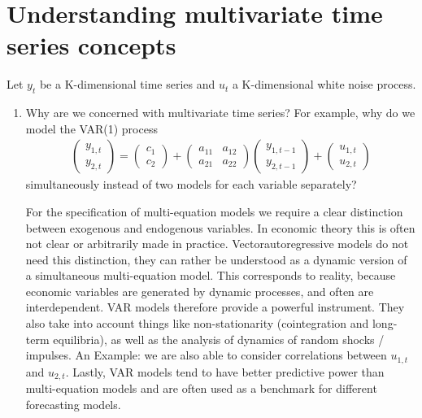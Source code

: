 \documentclass[a4paper]{scrartcl}
\begin{document}
    \section{Understanding multivariate time series concepts}
    Let $y_t$ be a K-dimensional time series and $u_t$ a K-dimensional white noise process.
    \begin{enumerate}
        \item Why are we concerned with multivariate time series? For example, why do we model the VAR(1) process
              \begin{align*}
                  \begin{pmatrix}y_{1,t}\\ y_{2,t}\end{pmatrix} = \begin{pmatrix} c_1 \\ c_2\end{pmatrix} + \begin{pmatrix}a_{11} & a_{12}\\ a_{21} & a_{22} \end{pmatrix} \begin{pmatrix}y_{1,{t-1}}\\ y_{2,{t-1}}\end{pmatrix} + \begin{pmatrix}u_{1,t}\\ u_{2,t}\end{pmatrix}
              \end{align*}
              simultaneously instead of two models for each variable separately?
              \begin{solution}
                  For the specification of multi-equation models we require a clear distinction between exogenous and endogenous variables. In economic theory this is often not clear or arbitrarily made in practice. Vectorautoregressive models do not need this distinction, they can rather be understood as a dynamic version of a simultaneous multi-equation model. This corresponds to reality, because economic variables are generated by dynamic processes, and often are interdependent. VAR models therefore provide a powerful instrument. They also take into account things like non-stationarity (cointegration and long-term equilibria), as well as the analysis of dynamics of random shocks / impulses. An Example: we are also able to consider correlations between $ u_ {1, t} $ and $ u_ {2, t} $. Lastly, VAR models tend to have better predictive power than multi-equation models and are often used as a benchmark for different forecasting models.
                  

\end{solution}
\end{enumerate}
\end{document}
